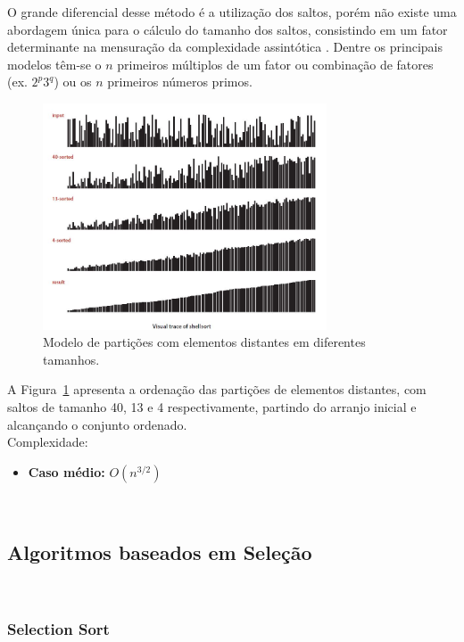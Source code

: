 \documentclass[conference,onecolumn]{IEEEtran}
\begin{document}
O grande diferencial desse método é a utilização dos saltos, porém não existe uma abordagem única para o cálculo do tamanho dos saltos, consistindo em um fator determinante na mensuração da complexidade assintótica \cite{ziviani}. Dentre os principais modelos têm-se o $n$ primeiros múltiplos de um fator ou combinação de fatores (ex. $2^p3^q$) ou os $n$ primeiros números primos.

\begin{figure}[H]

  \centering
    \includegraphics[width=0.75\textwidth]{images/shell.jpg}
     \caption{Modelo de partições com elementos distantes em diferentes tamanhos.}
      \label{image:shell}
\end{figure}

A Figura~\ref{image:shell} apresenta a ordenação das partições de elementos distantes, com saltos de tamanho 40, 13 e 4 respectivamente, partindo do arranjo inicial e alcançando o conjunto ordenado.\\

Complexidade:
\begin{itemize}
\item \textbf{Caso médio:} $O (n^{3/2})$
\end{itemize}
~\\
\subsection{Algoritmos baseados em Seleção}

~\\
\subsubsection{Selection Sort}
\end{document}
